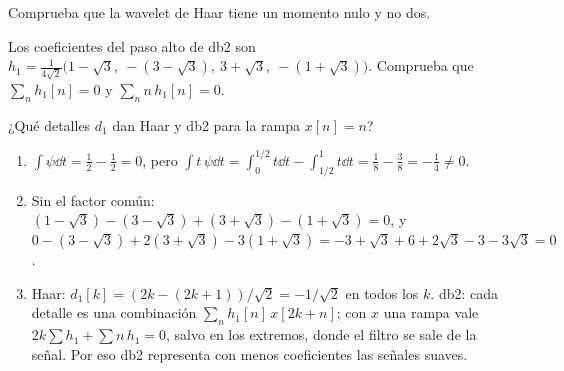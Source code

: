 \documentclass[11pt,a4paper]{scrartcl}
\begin{document}
\begin{ejercicio}
  \begin{incisos}[1]
    \item Comprueba que la wavelet de Haar tiene un momento nulo y no dos.
    \item Los coeficientes del paso alto de db2 son $h_1=\frac1{4\sqrt2}\big(1-\sqrt3,\ -(3-\sqrt3),\ 3+\sqrt3,\ -(1+\sqrt3)\big)$. Comprueba que $\sum_nh_1[n]=0$ y $\sum_nn\,h_1[n]=0$.
    \item ¿Qué detalles $d_1$ dan Haar y db2 para la rampa $x[n]=n$?
  \end{incisos}
\end{ejercicio}
\begin{solucion}
  \begin{enumerate}[label=\alph*)]
    \item $\int\psi\dd t=\frac12-\frac12=0$, pero $\int t\,\psi\dd t=\int_0^{1/2}t\dd t-\int_{1/2}^1t\dd t=\frac18-\frac38=-\frac14\ne0$.
    \item Sin el factor común: $(1-\sqrt3)-(3-\sqrt3)+(3+\sqrt3)-(1+\sqrt3)=0$, y $0-(3-\sqrt3)+2(3+\sqrt3)-3(1+\sqrt3)=-3+\sqrt3+6+2\sqrt3-3-3\sqrt3=0$.
    \item Haar: $d_1[k]=(2k-(2k+1))/\sqrt2=-1/\sqrt2$ en todos los $k$. db2: cada detalle es una combinación $\sum_nh_1[n]\,x[2k+n]$; con $x$ una rampa vale $2k\sum h_1+\sum n\,h_1=0$, salvo en los extremos, donde el filtro se sale de la señal. Por eso db2 representa con menos coeficientes las señales suaves.
  \end{enumerate}
\end{solucion}
\end{document}
